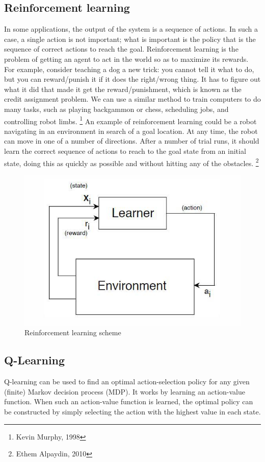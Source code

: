 \documentclass[a4paper]{article}
\begin{document}
\subsection{Reinforcement learning}
In some applications, the output of the system is a sequence of actions. In such a case, a single action is not important; what is important is the policy that is the sequence of correct actions to reach the goal.
Reinforcement learning is the problem of getting an agent to act in the world so as to maximize its rewards. For example, consider teaching a dog a new trick: you cannot tell it what to do, but you can reward/punish it if it does the right/wrong thing. It has to figure out what it did that made it get the reward/punishment, which is known as the credit assignment problem. We can use a similar method to train computers to do many tasks, such as playing backgammon or chess, scheduling jobs, and controlling robot limbs.
\footnote{Kevin Murphy, 1998}
An example of reinforcement learning could be a robot navigating in an environment in search of a goal location. At any time, the robot can move in one of a number of directions. After a number of trial runs, it should learn the correct sequence of actions to reach to the goal state
from an initial state, doing this as quickly as possible and without hitting any of the obstacles.
\footnote{Ethem Alpaydin, 2010}
\begin{figure}[htbp]
\begin{center}
\includegraphics[scale=0.5]{abstract.jpg}
\caption{Reinforcement learning scheme}
\end{center}
\end{figure}
\subsection{Q-Learning}
Q-learning can be used to find an optimal action-selection policy for any given (finite) Markov decision process (MDP). It works by learning an action-value function. When such an action-value function is learned, the optimal policy can be constructed by simply selecting the action with the highest value in each state.
\end{document}

